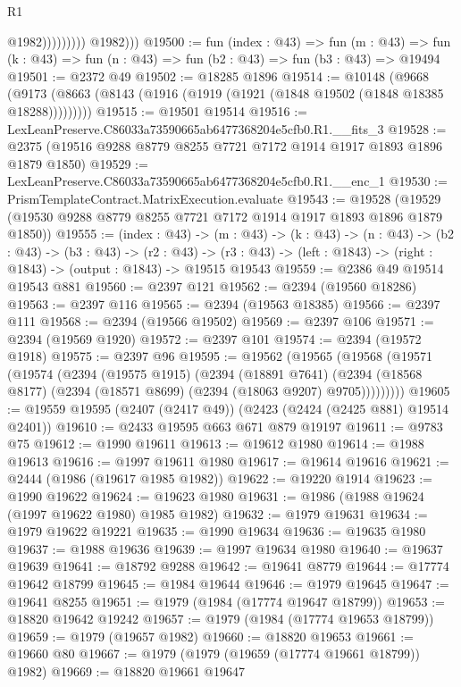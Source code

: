 \begin{lexlean}{R1}
\begin{coremodule}
                            @1982)))))))))
          @1982)))
@19500 := fun (index : @43) =>
  fun (m : @43) => fun (k : @43) => fun (n : @43) => fun (b2 : @43) => fun (b3 : @43) => @19494
@19501 := @2372 @49
@19502 := @18285 @1896
@19514 := @10148
    (@9668 (@9173 (@8663 (@8143 (@1916 (@1919 (@1921 (@1848 @19502 (@1848 @18385 @18288)))))))))
@19515 := @19501 @19514
@19516 := LexLeanPreserve.C86033a73590665ab6477368204e5cfb0.R1.__fits_3
@19528 := @2375 (@19516 @9288 @8779 @8255 @7721 @7172 @1914 @1917 @1893 @1896 @1879 @1850)
@19529 := LexLeanPreserve.C86033a73590665ab6477368204e5cfb0.R1.__enc_1
@19530 := PrismTemplateContract.MatrixExecution.evaluate
@19543 := @19528 (@19529 (@19530 @9288 @8779 @8255 @7721 @7172 @1914 @1917 @1893 @1896 @1879 @1850))
@19555 := (index : @43) ->
  (m : @43) ->
  (k : @43) ->
  (n : @43) ->
  (b2 : @43) ->
  (b3 : @43) ->
  (r2 : @43) -> (r3 : @43) -> (left : @1843) -> (right : @1843) -> (output : @1843) -> @19515 @19543
@19559 := @2386 @49 @19514 @19543 @881
@19560 := @2397 @121
@19562 := @2394 (@19560 @18286)
@19563 := @2397 @116
@19565 := @2394 (@19563 @18385)
@19566 := @2397 @111
@19568 := @2394 (@19566 @19502)
@19569 := @2397 @106
@19571 := @2394 (@19569 @1920)
@19572 := @2397 @101
@19574 := @2394 (@19572 @1918)
@19575 := @2397 @96
@19595 := @19562
    (@19565
      (@19568
        (@19571
          (@19574
            (@2394
              (@19575 @1915)
              (@2394
                (@18891 @7641)
                (@2394 (@18568 @8177) (@2394 (@18571 @8699) (@2394 (@18063 @9207) @9705)))))))))
@19605 := @19559 @19595 (@2407 (@2417 @49)) (@2423 (@2424 (@2425 @881) @19514 @2401))
@19610 := @2433 @19595 @663 @671 @879 @19197
@19611 := @9783 @75
@19612 := @1990 @19611
@19613 := @19612 @1980
@19614 := @1988 @19613
@19616 := @1997 @19611 @1980
@19617 := @19614 @19616
@19621 := @2444 (@1986 (@19617 @1985 @1982))
@19622 := @19220 @1914
@19623 := @1990 @19622
@19624 := @19623 @1980
@19631 := @1986 (@1988 @19624 (@1997 @19622 @1980) @1985 @1982)
@19632 := @1979 @19631
@19634 := @1979 @19622 @19221
@19635 := @1990 @19634
@19636 := @19635 @1980
@19637 := @1988 @19636
@19639 := @1997 @19634 @1980
@19640 := @19637 @19639
@19641 := @18792 @9288
@19642 := @19641 @8779
@19644 := @17774 @19642 @18799
@19645 := @1984 @19644
@19646 := @1979 @19645
@19647 := @19641 @8255
@19651 := @1979 (@1984 (@17774 @19647 @18799))
@19653 := @18820 @19642 @19242
@19657 := @1979 (@1984 (@17774 @19653 @18799))
@19659 := @1979 (@19657 @1982)
@19660 := @18820 @19653
@19661 := @19660 @80
@19667 := @1979 (@1979 (@19659 (@17774 @19661 @18799)) @1982)
@19669 := @18820 @19661 @19647

\end{coremodule}
\end{lexlean}
